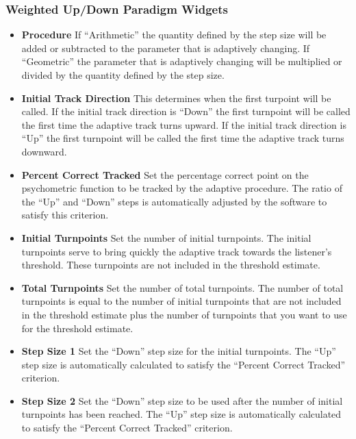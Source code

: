 \documentclass[a4paper,12pt,english]{sphinxmanual}
\begin{document}
\subsubsection{Weighted Up/Down Paradigm Widgets}
\label{graphical_user_interface:weighted-up-down-paradigm-widgets}\begin{itemize}
\item {} 
\textbf{Procedure} If “Arithmetic” the quantity defined by the step size
will be added or subtracted to the parameter that is adaptively
changing. If “Geometric” the parameter that is adaptively changing
will be multiplied or divided by the quantity defined by the step
size.

\item {} 
\textbf{Initial Track Direction} This determines when the first turpoint
will be called. If the initial track direction is “Down” the first
turnpoint will be called the first time the adaptive track turns
upward. If the initial track direction is “Up” the first turnpoint
will be called the first time the adaptive track turns downward.

\item {} 
\textbf{Percent Correct Tracked} Set the percentage correct point on the
psychometric function to be tracked by the adaptive procedure. The
ratio of the “Up” and “Down” steps is automatically adjusted by the
software to satisfy this criterion.

\item {} 
\textbf{Initial Turnpoints} Set the number of initial turnpoints. The
initial turnpoints serve to bring quickly the adaptive track towards
the listener’s threshold. These turnpoints are not included in the
threshold estimate.

\item {} 
\textbf{Total Turnpoints} Set the number of total turnpoints. The number
of total turnpoints is equal to the number of initial turnpoints that
are not included in the threshold estimate plus the number of
turnpoints that you want to use for the threshold estimate.

\item {} 
\textbf{Step Size 1} Set the “Down” step size for the initial turnpoints.
The “Up” step size is automatically calculated to satisfy the
“Percent Correct Tracked” criterion.

\item {} 
\textbf{Step Size 2} Set the “Down” step size to be used after the number
of initial turnpoints has been reached. The “Up” step size is
automatically calculated to satisfy the “Percent Correct Tracked”
criterion.

\end{itemize}
\end{document}
